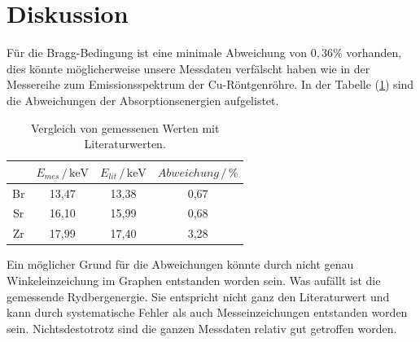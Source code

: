 \section{Diskussion}
Für die Bragg-Bedingung ist eine minimale Abweichung von $0,36\%$ vorhanden, dies könnte möglicherweise
unsere Messdaten verfälscht haben wie in der Messereihe zum Emissionsspektrum der Cu-Röntgenröhre.
In der Tabelle (\ref{tab:3}) sind die Abweichungen der Absorptionsenergien aufgelistet.
\begin{table}
  \centering
  \caption{Vergleich von gemessenen Werten mit Literaturwerten.}
  \label{tab:3}
  \begin{tabular}{c c c c}
    \toprule
     & $E_{mes}\,/ \, \text{keV}$  & $E_{lit}\,/ \, \text{keV}$ & $Abweichung \,/\,\%$ \\
    \midrule
    Br & 13,47 & 13,38 & 0,67\\
    Sr & 16,10 & 15,99 & 0,68\\
    Zr & 17,99 & 17,40 & 3,28\\
    \bottomrule
  \end{tabular}
\end{table}
Ein möglicher Grund für die Abweichungen könnte durch nicht genau Winkeleinzeichung im Graphen entstanden worden sein.
Was aufällt ist die gemessende Rydbergenergie. Sie entspricht nicht ganz den Literaturwert und kann durch systematische Fehler
als auch Messeinzeichungen entstanden worden sein.
Nichtsdestotrotz sind die ganzen Messdaten relativ gut getroffen worden.

\newpage
